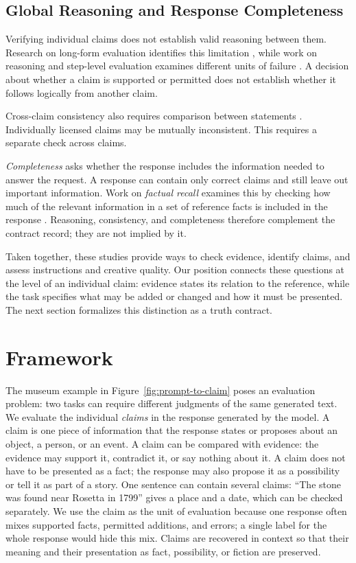 \documentclass{clv2025}
\begin{document}
\subsection{Global Reasoning and Response Completeness}\label{subsec:global}

Verifying individual claims does not establish valid reasoning between them.
Research on long-form evaluation identifies this limitation
\citep{yan_logicscore_2026}, while work on reasoning and step-level evaluation
examines different units of failure
\citep{arcuschin_cot_2025,pham_grace_2026}.
A decision about whether a claim is supported or permitted does not
establish whether it follows logically from another claim.

Cross-claim consistency also requires comparison between statements
\citep{mundler_selfcontradictory_2024}. Individually licensed claims may be
mutually inconsistent. This requires a separate check across claims.

\emph{Completeness} asks whether the response includes the information
needed to answer the request. A response can contain only correct claims
and still leave out important information. Work on \emph{factual recall}
examines this by checking how much of the relevant information in a set of
reference facts is included in the response
\citep{liu_verifact_2025,jafari_recall_2026}.
Reasoning, consistency, and completeness therefore complement the contract
record; they are not implied by it.

Taken together, these studies provide ways to check evidence, identify claims,
and assess instructions and creative quality. Our position connects these
questions at the level of an individual claim: evidence states its
relation to the reference, while the task specifies what may be added or
changed and how it must be presented. The next section formalizes this
distinction as a truth contract.

\section{Framework}\label{sec:framework}

The museum example in Figure~\ref{fig:prompt-to-claim} poses an evaluation
problem: two tasks can require different judgments of the same generated
text. We evaluate the individual \emph{claims} in the response generated
by the model.
A claim is one piece of information that the response states
or proposes about an object, a person, or an event. A claim can be compared
with evidence: the evidence may support it, contradict it, or say nothing
about it. A claim does not have to be presented as a fact; the response
may also propose it as a possibility or tell it as part of a story.
One sentence can contain several claims: ``The stone was found near
Rosetta in 1799'' gives a place and a date, which can be checked
separately. We use the claim as the unit of evaluation because one
response often mixes supported facts, permitted additions, and errors; a
single label for the whole response would hide this mix. Claims are
recovered in context so that their meaning and their presentation as fact,
possibility, or fiction are preserved.
\end{document}
